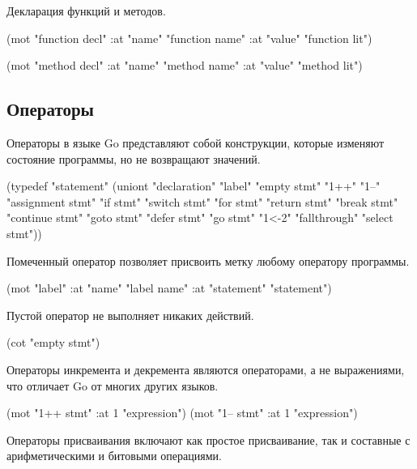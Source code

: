 \documentclass[12pt,twoside,russian]{article}
\begin{document}
Декларация функций и методов.

\begin{ABMLCode}
(mot "function decl" :at "name" "function name" 
                     :at "value" "function lit")

(mot "method decl"   :at "name" "method name"   
                     :at "value" "method lit")
\end{ABMLCode}


\subsection{Операторы}
Операторы в языке Go представляют собой конструкции, которые изменяют состояние программы, но не возвращают значений.

\begin{ABMLCode}
(typedef "statement" 
    (uniont "declaration" "label" "empty stmt" "1++" "1--" 
            "assignment stmt" "if stmt" "switch stmt" "for stmt" 
            "return stmt" "break stmt" "continue stmt" "goto stmt" 
            "defer stmt" "go stmt" "1<-2" "fallthrough" "select stmt"))
\end{ABMLCode}

Помеченный оператор позволяет присвоить метку любому оператору программы.

\begin{ABMLCode}
(mot "label" :at "name" "label name" :at "statement" "statement")
\end{ABMLCode}

Пустой оператор не выполняет никаких действий.

\begin{ABMLCode}
(cot "empty stmt")
\end{ABMLCode}

Операторы инкремента и декремента являются операторами, а не выражениями, что отличает Go от многих других языков.

\begin{ABMLCode}
(mot "1++ stmt" :at 1 "expression")
(mot "1-- stmt" :at 1 "expression")
\end{ABMLCode}

Операторы присваивания включают как простое присваивание, так и составные с арифметическими и битовыми операциями.
\end{document}
